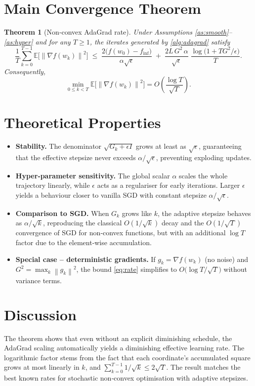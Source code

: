 \documentclass{article}
\newtheorem{theorem}{Theorem}
\newcommand{\E}{\mathbb{E}}
\newcommand{\norm}[1]{\left\lVert#1\right\rVert}
\begin{document}
\section*{Main Convergence Theorem}
\begin{theorem}[Non‑convex AdaGrad rate]\label{thm:main}
Under Assumptions \ref{as:smooth}–\ref{as:hyper} and for any $T\ge 1$, the iterates generated by \eqref{alg:adagrad} satisfy
\[
\frac{1}{T}\sum_{k=0}^{T-1}\E\!\big[\norm{\nabla f(w_{k})}^{2}\big]
\;\le\;
\frac{2\big(f(w_{0})-f_{\inf}\big)}{\alpha\sqrt{\epsilon}}
\;+\;
\frac{2L\,G^{2}\,\alpha}{\sqrt{\epsilon}}\;\frac{\log\!\big(1+TG^{2}/\epsilon\big)}{T}.
\tag{2}
\]
Consequently,
\[
\min_{0\le k<T}\E\!\big[\norm{\nabla f(w_{k})}^{2}\big]=O\!\left(\frac{\log T}{\sqrt{T}}\right).
\]
\end{theorem}

\section*{Theoretical Properties}
\begin{itemize}[leftmargin=*]
\item \textbf{Stability.} The denominator $\sqrt{G_{k}+\epsilon I}$ grows at least as $\sqrt{\epsilon}$, guaranteeing that the effective stepsize never exceeds $\alpha/\sqrt{\epsilon}$, preventing exploding updates.
\item \textbf{Hyper‑parameter sensitivity.} The global scalar $\alpha$ scales the whole trajectory linearly, while $\epsilon$ acts as a regulariser for early iterations. Larger $\epsilon$ yields a behaviour closer to vanilla SGD with constant stepsize $\alpha/\sqrt{\epsilon}$.
\item \textbf{Comparison to SGD.} When $G_{k}$ grows like $k$, the adaptive stepsize behaves as $\alpha/\sqrt{k}$, reproducing the classical $O(1/\sqrt{k})$ decay and the $O(1/\sqrt{T})$ convergence of SGD for non‑convex functions, but with an additional $\log T$ factor due to the element‑wise accumulation.
\item \textbf{Special case – deterministic gradients.} If $g_{k}=\nabla f(w_{k})$ (no noise) and $G^{2}= \max_{k}\norm{g_{k}}^{2}$, the bound \eqref{eq:rate} simplifies to $O\!\big(\log T/\sqrt{T}\big)$ without variance terms.
\end{itemize}

\section*{Discussion}
The theorem shows that even without an explicit diminishing schedule, the AdaGrad scaling automatically yields a diminishing effective learning rate. The logarithmic factor stems from the fact that each coordinate’s accumulated square grows at most linearly in $k$, and $\sum_{k=0}^{T-1}1/\sqrt{k}\le 2\sqrt{T}$. The result matches the best known rates for stochastic non‑convex optimisation with adaptive stepsizes.
\end{document}
